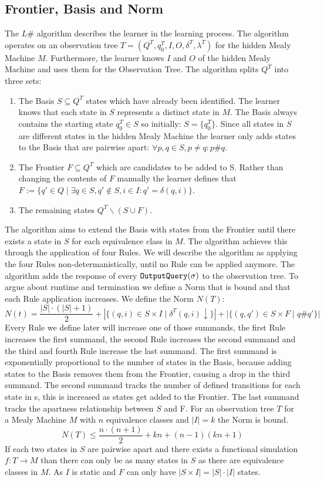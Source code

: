 \subsection{Frontier, Basis and Norm}
The $L\#$ algorithm describes the learner in the learning process. The algorithm operates on an observation tree $T=(Q^T,q_0^T,I,O,\delta^T,\lambda^T)$ for the hidden Mealy Machine $M$. Furthermore, the learner knows $I$ and $O$ of the hidden Mealy Machine and uses them for the Observation Tree. 
The algorithm splits $Q^T$ into three sets:
\begin{enumerate}
	\item The Basis $S\subseteq Q^T$ states which have already been identified. The learner knows that each state in $S$ represents a distinct state in $M$. The Basis always contains the starting state $q_0^T\in S$ so initially: $S=\{q_0^T\}$. Since all states in $S$ are different states in the hidden Mealy Machine the learner only adds states to the Basis that are pairwise apart: $\forall p,q\in S, p\neq q: p\#q$.
	\item The Frontier $F\subseteq Q^T$ which are candidates to be added to S. Rather than changing the contents of $F$ manually the learner defines that $F:=\{q'\in Q\mid \exists q\in S, q'\notin S, i\in I: q'=\delta(q,i)\}$.
	\item The remaining states $Q^T\backslash(S\cup F)$.
\end{enumerate}
The algorithm aims to extend the Basis with states from the Frontier until there exists a state in $S$ for each equivalence class in $M$. The algorithm achieves this through the application of four Rules. We will describe the algorithm as applying the four Rules non-determanistically, until no Rule can be applied anymore. The algorithm adds the response of every $\textnormal{\texttt{OutputQuery}}(\sigma)$ to the observation tree. To argue about runtime and termination we define a Norm that is bound and that each Rule application increases. We define the Norm $N(T)$: 
$$
N(t)=\frac{|S|\cdot(|S|+1)}{2}+|\{(q,i)\in S\times I\mid \delta^T(q,i)\downarrow\}|+|\{(q,q')\in S\times F\mid q\#q'\}|
$$
Every Rule we define later will increase one of those summands, the first Rule increases the first summand, the second Rule increases the second summand and the third and fourth Rule increase the last summand.
The first summand is exponentially proportional to the number of states in the Basis, because adding states to the Basis removes them from the Frontier, causing a drop in the third summand. The second summand tracks the number of defined transitions for each state in s, this is increased as states get added to the Frontier. The last summand tracks the apartness relationship between $S$ and F. For an observation tree $T$ for a Mealy Machine $M$ with $n$ equivalence classes and $|I|=k$ the Norm is bound. $$N(T)\leq\frac{n\cdot(n+1)}{2}+kn+(n-1)(kn+1)$$ %
If each two states in $S$ are pairwise apart and there exists a functional simulation $f:T\rightarrow M$ than there can only be as many states in $S$ as there are equivalence classes in $M$. As $I$ is static and $F$ can only have $|S\times I|=|S|\cdot|I|$ states.\\

